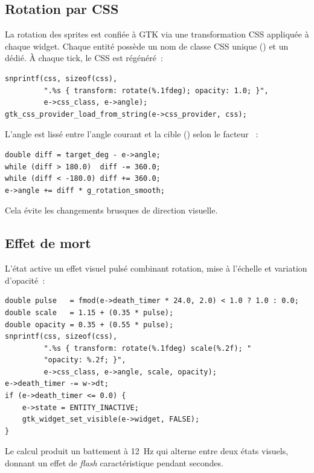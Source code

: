 \subsection{Rotation par CSS}

La rotation des sprites est confiée à GTK via une transformation
CSS appliquée à chaque widget. Chaque entité possède un nom de
classe CSS unique () et un 
dédié. À chaque tick, le CSS est régénéré~:

\begin{verbatim}
snprintf(css, sizeof(css),
         ".%s { transform: rotate(%.1fdeg); opacity: 1.0; }",
         e->css_class, e->angle);
gtk_css_provider_load_from_string(e->css_provider, css);
\end{verbatim}

L'angle est lissé entre l'angle courant et la cible
() selon le facteur
~:

\begin{verbatim}
double diff = target_deg - e->angle;
while (diff > 180.0)  diff -= 360.0;
while (diff < -180.0) diff += 360.0;
e->angle += diff * g_rotation_smooth;
\end{verbatim}

Cela évite les changements brusques de direction visuelle.

\subsection{Effet de mort}

L'état  active un effet visuel pulsé combinant
rotation, mise à l'échelle et variation d'opacité~:

\begin{verbatim}
double pulse   = fmod(e->death_timer * 24.0, 2.0) < 1.0 ? 1.0 : 0.0;
double scale   = 1.15 + (0.35 * pulse);
double opacity = 0.35 + (0.55 * pulse);
snprintf(css, sizeof(css),
         ".%s { transform: rotate(%.1fdeg) scale(%.2f); "
         "opacity: %.2f; }",
         e->css_class, e->angle, scale, opacity);
e->death_timer -= w->dt;
if (e->death_timer <= 0.0) {
    e->state = ENTITY_INACTIVE;
    gtk_widget_set_visible(e->widget, FALSE);
}
\end{verbatim}

Le calcul  produit
un battement à 12~Hz qui alterne entre deux états visuels,
donnant un effet de \emph{flash} caractéristique pendant
 secondes.

